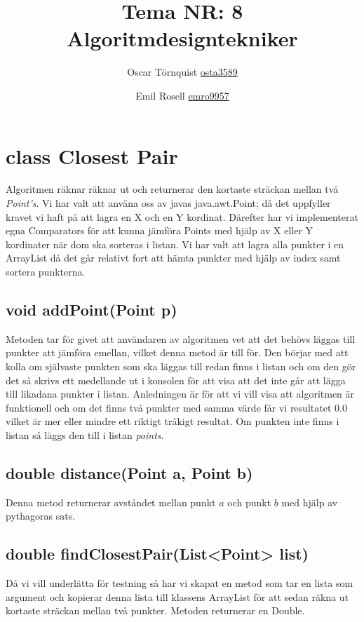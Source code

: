 \documentclass[a5paper,10pt,oneside]{article}
\title{Tema NR: 8 Algoritmdesigntekniker}
\author{Oscar Törnquist \url{osta3589} \and Emil Rosell \url{emro9957}}
\begin{document}
\maketitle

\section{class Closest Pair}
Algoritmen räknar räknar ut och returnerar den kortaste sträckan mellan två \textit{Point's}. Vi har valt att använa oss av javas java.awt.Point; då det uppfyller kravet vi haft på att lagra en X och en Y kordinat. Därefter har vi implementerat egna Comparators för att kunna jämföra Points med hjälp av X eller Y kordinater när dom ska sorteras i listan. Vi har valt att lagra alla punkter i en ArrayList då det går relativt fort att hämta punkter med hjälp av index samt sortera punkterna.

\subsection{void addPoint(Point p)}
Metoden tar för givet att användaren av algoritmen vet att det behövs läggas till punkter att jämföra emellan, vilket denna metod är till för. Den börjar med att kolla om självaste punkten som ska läggas till redan finns i listan och om den gör det så skrivs ett medellande ut i konsolen för att visa att det inte går att lägga till likadana punkter i listan. Anledningen är för att vi vill visa att algoritmen är funktionell och om det finns två punkter med samma värde får vi resultatet $0.0$ vilket är mer eller mindre ett riktigt tråkigt resultat.
Om punkten inte finns i listan så läggs den till i listan \textit{points}.

\subsection{double distance(Point a, Point b)} 
Denna metod returnerar avståndet mellan punkt $a$ och punkt $b$ med hjälp av pythagoras sats. 

\subsection{double findClosestPair(List<Point> list)} 
Då vi vill underlätta för testning så har vi skapat en metod som tar en lista som argument och kopierar denna lista till klassens ArrayList för att sedan räkna ut kortaste sträckan mellan två punkter. 
Metoden returnerar en Double.
\end{document}

